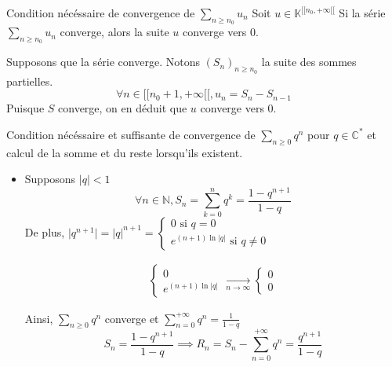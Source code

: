 \documentclass{article}
\date{22 juin 2024}
\begin{document}
\maketitle

\begin{question_kholle}{Condition nécéssaire de convergence de $\sum_{n \geqslant n_0} u_n$}
    Soit $u \in \mathbb{K}^{[ \! [ n_{0}, + \infty [ \![}$
    Si la série $\sum_{n\geqslant n_{0}}u_{n}$ converge, alors la suite $u$ converge vers $0$.
    
    Supposons que la série converge. Notons $(S_{n})_{n\geqslant n_{0}}$ la suite des sommes partielles.
$$\forall n \in [ \! [ n_{0}+1, +\infty [ \![, u_{n} = S_{n} - S_{n-1}$$
    Puisque $S$ converge, on en déduit que $u$ converge vers $0$.
\end{question_kholle}
\begin{question_kholle}{Condition nécéssaire et suffisante de convergence de $\sum_{n\geqslant 0}q^{n}$ pour $q \in \mathbb{C}^{*}$ et calcul de la somme et du reste lorsqu'ils existent.}
    \begin{itemize}[label=$\star$]
        \item Supposons $\lvert q \rvert<1$
        $$\forall n \in \mathbb{N}, S_{n} = \sum_{k=0}^{n}q^{k} = \frac{1-q^{n+1}}{1-q}$$
        De plus, $\lvert q^{n+1} \rvert=\lvert q \rvert^{n+1}= \left\{ \begin{array}{ll}0 \text{ si }q=0\\ e^{(n+1)\ln \lvert q \rvert} \text{ si }q\neq 0\end{array}\right.$
        
        \begin{align*}
            \left\{ \begin{array}{ll}
                0 \\
                e^{(n+1)\ln \lvert q \rvert } 
            \end{array}\right. \xrightarrow[n\to \infty]{} \left\{ \begin{array}{ll}
                0 \\
                0 
            \end{array}\right.
        \end{align*}
        
        Ainsi, $\sum_{n\geqslant 0}q^{n}$ converge et $\sum_{n=0}^{+\infty}q^{n}=\frac{1}{1-q}$
        $$S_{n} = \frac{1-q^{n+1}}{1-q} \implies R_{n} = S_{n} - \sum_{n=0}^{+\infty}q^{n}= \frac{q^{n+1}}{1-q}$$
        

\end{itemize}
\end{question_kholle}
\end{document}
